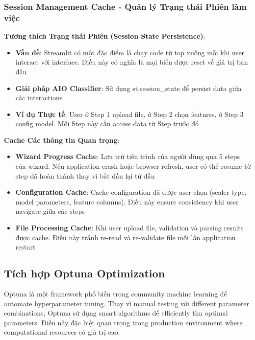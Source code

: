 \subsubsection{Session Management Cache - Quản lý Trạng thái Phiên làm việc}

\textbf{Tương thích Trạng thái Phiên (Session State Persistence)}:
\begin{itemize}[leftmargin=*]
    \item \textbf{Vấn đề}: Streamlit có một đặc điểm là chạy code từ top xuống mỗi khi user interact với interface. Điều này có nghĩa là mọi biến được reset về giá trị ban đầu
    \item \textbf{Giải pháp AIO Classifier}: Sử dụng st.session\_state để persist data giữa các interactions
    \item \textbf{Ví dụ Thực tế}: User ở Step 1 upload file, ở Step 2 chọn features, ở Step 3 config model. Mỗi Step này cần access data từ Step trước đó
\end{itemize}

\textbf{Cache Các thông tin Quan trọng}:
\begin{itemize}[leftmargin=*]
    \item \textbf{Wizard Progress Cache}: Lưu trữ tiến trình của người dùng qua 5 steps của wizard. Nếu application crash hoặc browser refresh, user có thể resume từ step đã hoàn thành thay vì bắt đầu lại từ đầu
    
    \item \textbf{Configuration Cache}: Cache configuration đã được user chọn (scaler type, model parameters, feature columns). Điều này ensure consistency khi user navigate giữa các steps
    
    \item \textbf{File Processing Cache}: Khi user upload file, validation và parsing results được cache. Điều này tránh re-read và re-validate file mỗi lần application restart
\end{itemize}

\subsection{Tích hợp Optuna Optimization}\label{subsec:optuna-optimization}

\noindent
Optuna là một framework phổ biến trong community machine learning để automate hyperparameter tuning. Thay vì manual testing với different parameter combinations, Optuna sử dụng smart algorithms để efficiently tìm optimal parameters. Điều này đặc biệt quan trọng trong production environment where computational resources có giá trị cao.

